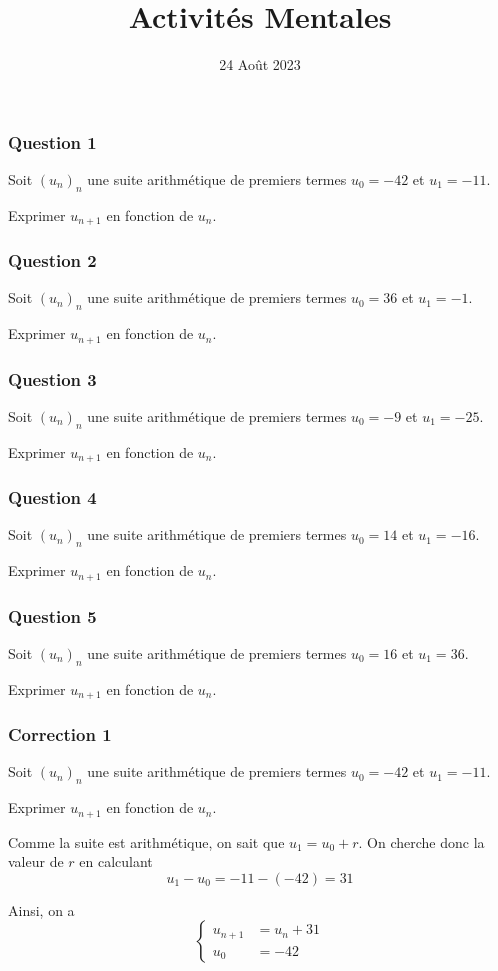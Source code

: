 \documentclass[15pt, mathserif]{beamer}
\title{Activités Mentales}
\date{24 Août 2023}
\begin{document}
\begin{frame}
    \titlepage
\end{frame}

\begin{frame} 
	\frametitle{Question 1}
Soit $(u_n)_n$ une suite arithmétique de premiers termes $u_0=-42$ et $u_1=-11$. 
 
 Exprimer $u_{n+1}$ en fonction de $u_n$.\end{frame}


\begin{frame} 
	\frametitle{Question 2}
Soit $(u_n)_n$ une suite arithmétique de premiers termes $u_0=36$ et $u_1=-1$. 
 
 Exprimer $u_{n+1}$ en fonction de $u_n$.\end{frame}


\begin{frame} 
	\frametitle{Question 3}
Soit $(u_n)_n$ une suite arithmétique de premiers termes $u_0=-9$ et $u_1=-25$. 
 
 Exprimer $u_{n+1}$ en fonction de $u_n$.\end{frame}


\begin{frame} 
	\frametitle{Question 4}
Soit $(u_n)_n$ une suite arithmétique de premiers termes $u_0=14$ et $u_1=-16$. 
 
 Exprimer $u_{n+1}$ en fonction de $u_n$.\end{frame}


\begin{frame} 
	\frametitle{Question 5}
Soit $(u_n)_n$ une suite arithmétique de premiers termes $u_0=16$ et $u_1=36$. 
 
 Exprimer $u_{n+1}$ en fonction de $u_n$.\end{frame}


\begin{frame}
\vspace{-10mm}
	\frametitle{Correction 1}
Soit $(u_n)_n$ une suite arithmétique de premiers termes $u_0=-42$ et $u_1=-11$. 
 
 Exprimer $u_{n+1}$ en fonction de $u_n$. 
 
 \vspace*{1cm} 
 
 Comme la suite est arithmétique, on sait que $u_1=u_0+r$. On cherche donc la valeur de $r$ en calculant $$u_1-u_0=-11-\left(-42\right)=31$$ 
 
 Ainsi, on a $$ \left\{ 
 \begin{array}{ll} 
 u_{n+1} &= u_n +31 \\ 
 u_0 & = -42 
 \end{array} 
 \right. $$ 
 \end{frame}
\end{document}
